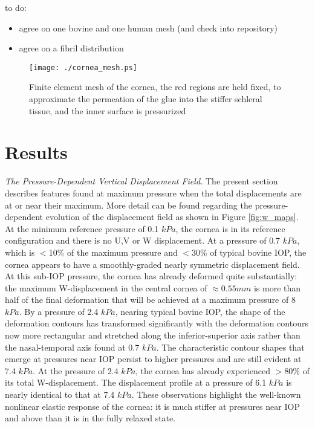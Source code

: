 \documentclass[11pt,oneside]{elsart}
\newcommand{\figref}[1]{Figure \ref{#1}}
\begin{document}
to do:
\begin{itemize}
\item agree on one bovine and one human mesh (and check into repository)
\item agree on a fibril distribution
\end{itemize}

\pagebreak
%
%
\begin{figure}[hptb]
\begin{center}
\texttt{[image: ./cornea\_mesh.ps]} 
  \caption{Finite element mesh of the cornea, the red regions are held
fixed, to approximate the permeation of the glue into the stiffer 
schleral tissue, and the inner surface is pressurized}
  \label{fig:cornea_mesh}
\end{center}
\end{figure}


\section{Results}
\label{sec:bulge_results}

{\it The Pressure-Dependent Vertical Displacement Field.}
The present section describes features found at maximum pressure when the total displacements are at or near their maximum.  More detail can be found regarding the pressure-dependent evolution of the displacement field as shown in \figref{fig:w_maps}.  At the minimum reference pressure of 0.1 $kPa$, the cornea is in its reference configuration and there is no U,V or W displacement.  At a pressure of 0.7 $kPa$, which is $<$10\% of the maximum pressure and $<$30\% of typical bovine IOP, the cornea appears to have a smoothly-graded nearly symmetric displacement field.  At this sub-IOP pressure, the cornea has already deformed quite substantially: the maximum W-displacement in the central cornea of $\approx 0.55 mm$ is more than half of the final deformation that will be achieved at a maximum pressure of 8 $kPa$.  By a pressure of 2.4 $kPa$, nearing typical bovine IOP, the shape of the deformation contours has transformed significantly with the deformation contours now more rectangular and stretched along the inferior-superior axis rather than the nasal-temporal axis found at 0.7 $kPa$.  The characteristic contour shapes that emerge at pressures near IOP persist to higher pressures and are still evident at 7.4 $kPa$.  At the pressure of 2.4 $kPa$, the cornea has already experienced $>$80\% of its total W-displacement.  The displacement profile at a pressure of 6.1 $kPa$ is nearly identical to that at 7.4 $kPa$. These observations highlight the well-known nonlinear elastic response of the cornea: it is much stiffer at pressures near IOP and above than it is in the fully relaxed state.  
%
\end{document}

